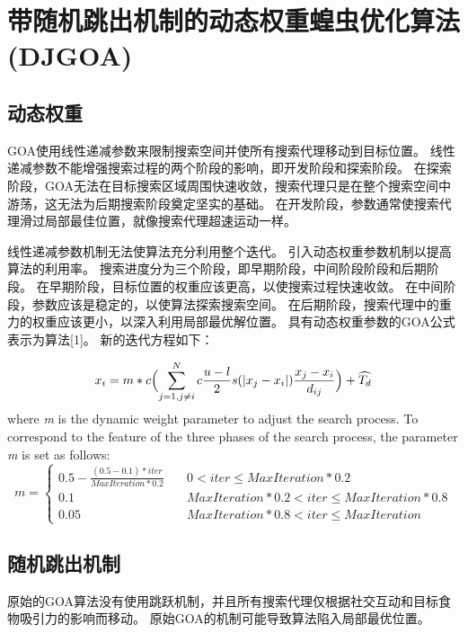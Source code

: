 \section{带随机跳出机制的动态权重蝗虫优化算法(DJGOA)}\label{sec:task_scheduling_DJGOA}
\subsection{动态权重}
GOA使用线性递减参数来限制搜索空间并使所有搜索代理移动到目标位置。 线性递减参数不能增强搜索过程的两个阶段的影响，即开发阶段和探索阶段。 在探索阶段，GOA无法在目标搜索区域周围快速收敛，搜索代理只是在整个搜索空间中游荡，这无法为后期搜索阶段奠定坚实的基础。 在开发阶段，参数通常使搜索代理滑过局部最佳位置，就像搜索代理超速运动一样。

线性递减参数机制无法使算法充分利用整个迭代。 引入动态权重参数机制以提高算法的利用率。 搜索进度分为三个阶段，即早期阶段，中间阶段阶段和后期阶段。 在早期阶段，目标位置的权重应该更高，以使搜索过程快速收敛。 在中间阶段，参数应该是稳定的，以使算法探索搜索空间。 在后期阶段，搜索代理中的重力的权重应该更小，以深入利用局部最优解位置。 具有动态权重参数的GOA公式表示为算法[1]。 新的迭代方程如下：

\begin{equation}
    x_i = m*c \Bigl(\sum_{j=1,j\neq{i}}^N c \frac{u-l}{2}s (\lvert x_j-x_i \rvert )\frac{x_j-x_i}{d_{ij}} \Bigr) + \widehat{T_d}
\end{equation}
where \emph{m} is the dynamic weight parameter to adjust the search process. To correspond to the feature of the three phases of the search process, the parameter \emph{m} is set as follows:
\begin{equation}
    m= \begin{cases}
        0.5-\frac{(0.5-0.1)*iter}{MaxIteration*0.2} & \quad 0<iter\leq MaxIteration*0.2 \\
        0.1&\quad MaxIteration*0.2<iter \leq MaxIteration*0.8 \\
        0.05& \quad  MaxIteration*0.8 < iter \leq MaxIteration
        \end{cases} 
\end{equation}

\subsection{随机跳出机制}

原始的GOA算法没有使用跳跃机制，并且所有搜索代理仅根据社交互动和目标食物吸引力的影响而移动。 原始GOA的机制可能导致算法陷入局部最优位置。

